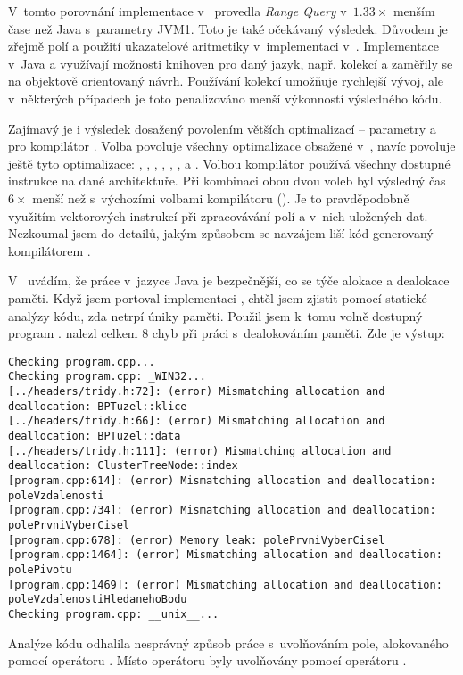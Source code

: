 V~tomto porovnání implementace v~\CC{} provedla \emph{Range Query} v~$\num{1.33}\times$ menším čase než Java s~parametry JVM1.
Toto je také očekávaný výsledek.
Důvodem je zřejmě \cite{Kmunicek2011thesis} polí a použití ukazatelové aritmetiky v~implementaci  v~\CC{}.
Implementace v~Java a \CS{} využívají možnosti knihoven pro daný jazyk, např. kolekcí a zaměřily se na objektově orientovaný návrh.
Používání kolekcí umožňuje rychlejší vývoj, ale v~některých případech je toto penalizováno menší výkonností výsledného kódu.

Zajímavý je i výsledek dosažený povolením větších optimalizací -- parametry  a  pro kompilátor \CC{}.
Volba  povoluje všechny optimalizace obsažené v~, navíc povoluje ještě tyto optimalizace: , , , , , ,  a \linebreak {}\cite{gccoptions}.
Volbou  kompilátor používá všechny dostupné instrukce na dané architektuře.
Při kombinaci obou dvou voleb byl výsledný čas $\num{6}\times$ menší než s~výchozími volbami kompilátoru ().
Je to pravděpodobně využitím vektorových instrukcí při zpracovávání polí a v~nich uložených dat.
Nezkoumal jsem do detailů, jakým způsobem se navzájem liší kód generovaný kompilátorem \CC.

V~ uvádím, že práce v~jazyce Java je bezpečnější, co se týče alokace a dealokace paměti.
Když jsem portoval implementaci \CC{}, chtěl jsem zjistit pomocí statické analýzy kódu, zda netrpí úniky paměti.
Použil jsem k~tomu volně dostupný program \cite{cppcheck}.
 nalezl celkem \num{8} chyb při práci s~dealokováním paměti. Zde je výstup:
{\tiny
\begin{verbatim}
Checking program.cpp...
Checking program.cpp: _WIN32...
[../headers/tridy.h:72]: (error) Mismatching allocation and deallocation: BPTuzel::klice
[../headers/tridy.h:66]: (error) Mismatching allocation and deallocation: BPTuzel::data
[../headers/tridy.h:111]: (error) Mismatching allocation and deallocation: ClusterTreeNode::index
[program.cpp:614]: (error) Mismatching allocation and deallocation: poleVzdalenosti
[program.cpp:734]: (error) Mismatching allocation and deallocation: polePrvniVyberCisel
[program.cpp:678]: (error) Memory leak: polePrvniVyberCisel
[program.cpp:1464]: (error) Mismatching allocation and deallocation: polePivotu
[program.cpp:1469]: (error) Mismatching allocation and deallocation: poleVzdalenostiHledanehoBodu
Checking program.cpp: __unix__...
\end{verbatim}
}

Analýze kódu odhalila nesprávný způsob práce s~uvolňováním pole, alokovaného pomocí operátoru . Místo operátoru  byly uvolňovány pomocí operátoru \cite{Stroustrup:1997:CPL:523265}.